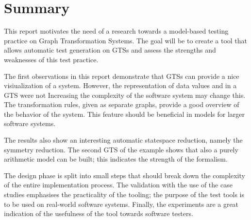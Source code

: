 \section{Summary}\label{sec:conclusion}
This report motivates the need of a research towards a model-based testing practice on Graph Transformation Systems. The goal will be to create a tool that allows automatic test generation on GTSs and assess the strengths and weaknesses of this test practice.

The first observations in this report demonstrate that GTSs can provide a nice visiualization of a system. However, the representation of data values and in a GTS were not   Increasing the complexity of the software system may change this. The transformation rules, given as separate graphs, provide a good overview of the behavior of the system. This feature should be beneficial in models for larger software systems.

The results also show an interesting automatic statespace reduction, namely the symmetry reduction. The second GTS of the example shows that also a purely arithmetic model can be built; this indicates the strength of the formalism.

The design phase is split into small steps that should break down the complexity of the entire implementation process. The validation with the use of the case studies emphasises the practicality of the tooling; the purpose of the test tools is to be used on real-world software systems. Finally, the experiments are a great indication of the usefulness of the tool towards software testers.
